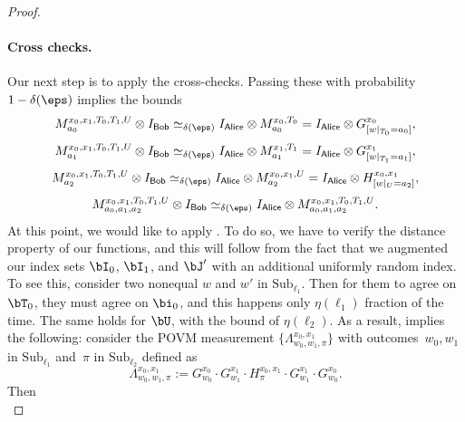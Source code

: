 \documentclass[11pt]{article}
\newcommand{\codes}{\mathrm{Sub}}
\newcommand{\reg}[1]{{\mathsf{#1}}}
\begin{document}
\begin{proof}
\paragraph{Cross checks.}
Our next step is to apply the cross-checks. Passing these with probability $1-\delta(\eps)$ implies the bounds
\begin{equation}\label{eq:apply-the-cross-checks}
M^{x_0, x_1, T_0, T_1, U}_{a_0} \otimes I_{\reg{Bob}}\simeq_{\delta(\eps)} I_{\reg{Alice}} \otimes M^{x_0, T_0}_{a_0}
= I_{\reg{Alice}} \otimes G^{x_0}_{[w|_{T_0} = a_0]},
\end{equation}
\begin{equation}\label{eq:apply-the-cross-checks-2}
M^{x_0, x_1, T_0, T_1, U}_{a_1} \otimes I_{\reg{Bob}}\simeq_{\delta(\eps)} I_{\reg{Alice}} \otimes  M^{x_1, T_1}_{a_1}
= I_{\reg{Alice}} \otimes G^{x_1}_{[w|_{T_1} = a_1]},
\end{equation}
\begin{equation*}
M^{x_0, x_1, T_0, T_1, U}_{a_2} \otimes I_{\reg{Bob}}\simeq_{\delta(\eps)} I_{\reg{Alice}} \otimes  M^{x_0, x_1, U}_{a_2}
= I_{\reg{Alice}} \otimes H^{x_0, x_1}_{[w|_{U} = a_2]},
\end{equation*}
\begin{equation}\label{eq:Ms-self-consistency}
M^{x_0, x_1, T_0, T_1, U}_{a_0, a_1, a_2} \otimes I_{\reg{Bob}}\simeq_{\delta(\eps)} I_{\reg{Alice}} \otimes  M^{x_0, x_1, T_0, T_1, U}_{a_0, a_1, a_2}.
\end{equation}
At this point, we would like to apply .
To do so, we have to verify the distance property of our functions,
and this will follow from the fact that we augmented our index sets $\bI_0$, $\bI_1$, and $\bJ'$ with an additional uniformly random index.
To see this, consider two nonequal $w$ and $w'$ in $\codes_{\ell_1}$.
Then for them to agree on $\bT_0$, they must agree on $\bi_0$, and this happens only $\eta(\ell_1)$ fraction of the time.
The same holds for $\bU$, with the bound of $\eta(\ell_2)$.
As a result,  implies the following:
consider the POVM measurement $\{\Lambda^{x_0, x_1}_{w_0, w_1, \pi}\}$
with outcomes~$w_0, w_1$ in $\codes_{\ell_1}$ and~$\pi$ in $\codes_{\ell_2}$
defined as
\begin{equation}\label{eq:dont-touch-me-bro}
\Lambda^{x_0, x_1}_{w_0, w_1, \pi}
:= G^{x_0}_{w_0} \cdot G^{x_1}_{w_1} \cdot H^{x_0, x_1}_{\pi} \cdot G^{x_1}_{w_1} \cdot G^{x_0}_{w_0}.
\end{equation}
Then
\begin{equation}\label{eq:gonna-use-this-once}

\end{equation}
\end{proof}
\end{document}
